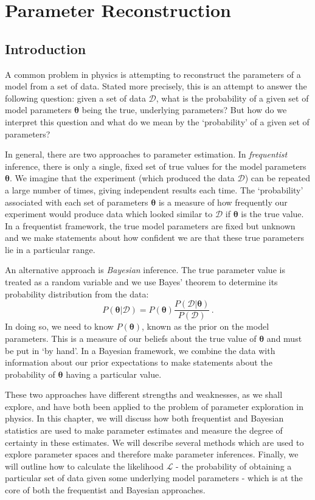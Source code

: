 \chapter{Parameter Reconstruction}
\label{ch:ParamRecon}

\section{Introduction}

A common problem in physics is attempting to reconstruct the parameters of a model from a set of data. Stated more precisely, this is an attempt to answer the following question: given a set of data $\mathcal{D}$, what is the probability of a given set of model parameters $\boldsymbol\theta$ being the true, underlying parameters? But how do we interpret this question and what do we mean by the `probability' of a given set of parameters?

In general, there are two approaches to parameter estimation. In \textit{frequentist} inference, there is only a single, fixed set of true values for the model parameters $\boldsymbol\theta$. We imagine that the experiment (which produced the data $\mathcal{D}$) can be repeated a large number of times, giving independent results each time. The `probability' associated with each set of parameters $\boldsymbol\theta$ is a measure of how frequently our experiment would produce data which looked similar to $\mathcal{D}$ if $\boldsymbol\theta$ is the true value. In a frequentist framework, the true model parameters are fixed but unknown and we make statements about how confident we are that these true parameters lie in a particular range.

An alternative approach is \textit{Bayesian} inference. The true parameter value is treated as a random variable and we use Bayes' theorem to determine its probability distribution from the data:
\begin{equation}
P(\boldsymbol\theta|\mathcal{D}) = P(\boldsymbol\theta) \frac{P(\mathcal{D}|\boldsymbol\theta)}{P(\mathcal{D})}\,.
\end{equation}
In doing so, we need to know $P(\boldsymbol\theta)$, known as the prior on the model parameters. This is a measure of our beliefs about the true value of $\boldsymbol\theta$ and must be put in `by hand'. In a Bayesian framework, we combine the data with information about our prior expectations to make statements about the probability of $\boldsymbol\theta$ having a particular value.

These two approaches have different strengths and weaknesses, as we shall explore, and have both been applied to the problem of parameter exploration in physics. In this chapter, we will discuss how both frequentist and Bayesian statistics are used to make parameter estimates and measure the degree of certainty in these estimates. We will describe several methods which are used to explore parameter spaces and therefore make parameter inferences. Finally, we will outline how to calculate the likelihood $\mathcal{L}$ - the probability of obtaining a particular set of data given some underlying model parameters - which is at the core of both the frequentist and Bayesian approaches.

